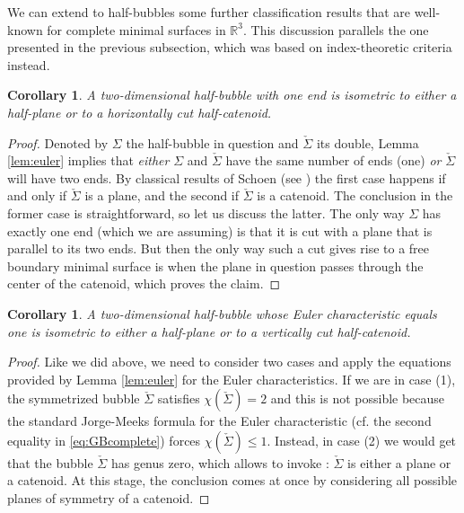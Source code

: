 \documentclass[10pt]{article}
\newtheorem{cor}[thm]{Corollary}
\theoremstyle{definition}\newtheorem{definition}[thm]{Definition}
\numberwithin{equation}{section}
\newcommand{\R}{\mathbb{R}}\newcommand{\C}{\mathbb{C}}\newcommand{\N}{\mathbb{N}}
\begin{document}
        	
        	
        	We can extend to half-bubbles some further classification results that are well-known for complete minimal surfaces in $\R^3$. This discussion parallels the one presented in the previous subsection, which was based on index-theoretic criteria instead.
        	
        	
        	\begin{cor}\label{cor:oneend}
        		A two-dimensional half-bubble with one end is isometric to either a half-plane or to a horizontally cut half-catenoid.
        	\end{cor}	
        	
        	\begin{proof}
        		Denoted by $\Sigma$ the half-bubble in question and $\check{\Sigma}$ its double, Lemma \ref{lem:euler} implies that \textsl{either} $\Sigma$ and $\check{\Sigma}$ have the same number of ends (one) \textsl{or} $\check{\Sigma}$ will have two ends. By classical results of Schoen (see \cite{Sc83}) the first case happens if and only if $\check{\Sigma}$ is a plane, and the second if $\check{\Sigma}$ is a catenoid. The conclusion in the former case is straightforward, so let us discuss the latter. The only way $\Sigma$ has exactly one end (which we are assuming) is that it is cut with a plane that is parallel to its two ends. But then the only way such a cut gives rise to a free boundary minimal surface is when the plane in question passes through the center of the catenoid, which proves the claim.
        	\end{proof}	
        	
        	\begin{cor}\label{cor:genuszero}
        		A two-dimensional half-bubble whose Euler characteristic equals one is isometric to either a half-plane or to a vertically cut half-catenoid.
        	\end{cor}	
        	
        	\begin{proof}
        		Like we did above, we need to consider two cases and apply the equations provided by Lemma \ref{lem:euler} for the Euler characteristics. If we are in case (1), the symmetrized bubble $\check{\Sigma}$ satisfies $\chi(\check{\Sigma})=2$ and this is not possible because the standard Jorge-Meeks formula for the Euler characteristic (cf. the second equality in \eqref{eq:GBcomplete}) forces $\chi(\check{\Sigma})\leqslant 1$. 
        		Instead, in case (2) we would get that the bubble $\check{\Sigma}$ has genus zero, which allows to invoke \cite{LR91}: $\check{\Sigma}$ is either a plane or a catenoid. At this stage, the conclusion comes at once by considering all possible planes of symmetry of a catenoid.
        	\end{proof}	
        	
\end{document}
